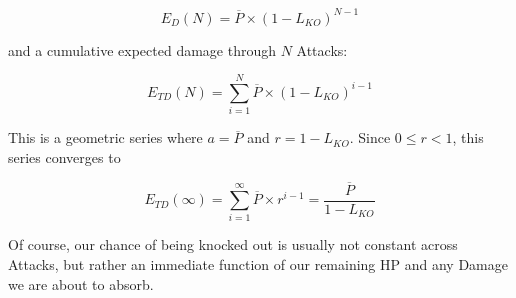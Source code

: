 \[ E_D(N) = \overline{P} \times (1 - L_{KO})^{N-1} \]

and a cumulative expected damage through $N$ Attacks:

\[ E_{TD}(N) = \sum^N_{i=1} \overline{P} \times (1 - L_{KO})^{i-1} \]

This is a geometric series where $a = \overline{P}$ and $r = 1 - L_{KO}$.
Since $0 \leq r < 1$, this series converges to

\[ E_{TD}(\infty) = \sum^\infty_{i=1} \overline{P} \times r^{i-1} = \frac{\overline{P}}{1 - L_{KO}} \]

Of course, our chance of being knocked out is usually not constant across
Attacks, but rather an immediate function of our remaining HP and any
Damage we are about to absorb.
